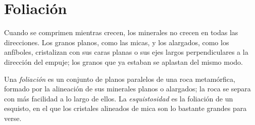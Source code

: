 \section{Foliación}\label{sec:g12:metamorphic-rocks:foliation}

Cuando se comprimen mientras crecen, los minerales no crecen en todas las
direcciones. Los granos planos, como las micas, y los alargados, como los
anfíboles, cristalizan con sus caras planas o sus ejes largos perpendiculares
a la dirección del empuje; los granos que ya estaban se aplastan del mismo
modo.

\begin{definition}\label{def:g12:metamorphic-rocks:foliation}
Una \emph{foliación} es un conjunto de planos paralelos
de una roca metamórfica, formado por la alineación de sus minerales planos o
alargados; la roca se separa con más facilidad a lo largo de ellos. La
\emph{esquistosidad} es la foliación de un esquisto, en el
que los cristales alineados de mica son lo bastante grandes para verse.
\end{definition}


